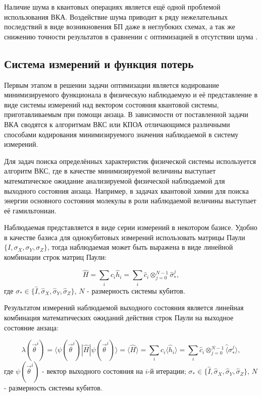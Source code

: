 \documentclass[14pt]{extarticle}
\begin{document}
\qquad Наличие шума в квантовых операциях является ещё одной проблемой использования ВКА. Воздействие шума приводит к ряду нежелательных последствий в виде возникновения БП даже в неглубоких схемах, а так же снижению точности результатов в сравнении с оптимизацией в отсутствии шума \cite{Wang_2021}.


\subsection{Система измерений и функция потерь}

\qquad Первым этапом в решении задачи оптимизации является кодирование минимизируемого функционала в физическую наблюдаемую и её представление в виде системы измерений над вектором состояния квантовой системы, приготавливаемым при помощи анзаца. В зависимости от поставленной задачи ВКА сводятся к алгоритмам ВКС или КПОА отличающимся различными способами кодирования минимизируемого значения наблюдаемой в систему измерений.

\qquad Для задач поиска определённых характеристик физической системы используется алгоритм ВКС, где в качестве минимизируемой величины выступает математическое ожидание анализируемой физической наблюдаемой для выходного состояния анзаца. Например, в задачах квантовой химии для поиска энергии основного состояния молекулы в роли наблюдаемой величины выступает её гамильтониан.

\qquad Наблюдаемая представляется в виде серии измерений в некотором базисе. Удобно в качестве базиса для однокубитовых измерений использовать матрицы Паули $ \{I,\sigma_{X}, \sigma_{Y}, \sigma_{Z}  \}$, тогда наблюдаемая может быть выражена в виде линейной комбинации строк матриц Паули:

\begin{equation}
\hat H=\sum_{i} c_{i} \hat h_{i} = \sum_{i} \hat c_{i} \otimes^{N-1}_{j = 0} \hat \sigma^{j}_{*},
\end{equation} где $ \sigma_{*} \in \{\hat I,\hat \sigma_{X}, \hat \sigma_{Y}, \hat \sigma_{Z}  \} $, $N$ - размерность системы кубитов.

\qquad Результатом измерений наблюдаемой выходного состояния является линейная комбинация математических ожиданий действия строк Паули на выходное состояние анзаца: 

\begin{equation}
\lambda(\vec{\theta}^{i}) = \langle \psi(\vec{\theta}^{i}) | \hat H | \psi(\vec{\theta}^{i}) \rangle = \langle \hat H \rangle =\sum_{i} c_{i} \langle \hat h_{i} \rangle = \sum_{i} \hat c_{i} \otimes^{N-1}_{j = 0} \hat \langle \sigma^{j}_{*} \rangle,
\end{equation} где $\psi(\vec{\theta}^{i})$ - вектор выходного состояния на $i$-й итерации; $ \sigma_{*} \in \{\hat I,\hat \sigma_{X}, \hat \sigma_{Y}, \hat \sigma_{Z}  \} $, $N$ - размерность системы кубитов.
\end{document}

